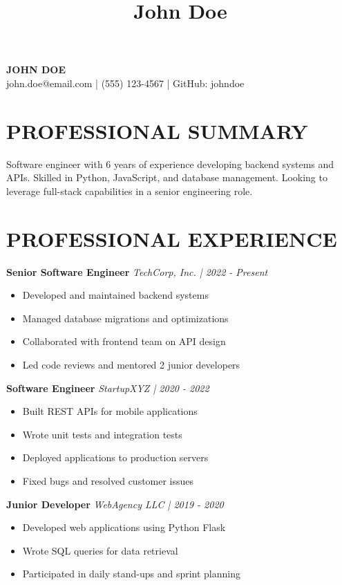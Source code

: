 \documentclass[11pt]{article}
\title{John Doe}
\author{}
\date{}
\begin{document}
\begin{center}
    {\Large \textbf{JOHN DOE}} \\
    john.doe@email.com | (555) 123-4567 | GitHub: johndoe
\end{center}

\section*{PROFESSIONAL SUMMARY}
Software engineer with 6 years of experience developing backend systems and APIs. Skilled in Python, JavaScript, and database management. Looking to leverage full-stack capabilities in a senior engineering role.

\section*{PROFESSIONAL EXPERIENCE}

\textbf{Senior Software Engineer} \hfill \textit{TechCorp, Inc. | 2022 - Present}
\begin{itemize}
    \item Developed and maintained backend systems
    \item Managed database migrations and optimizations
    \item Collaborated with frontend team on API design
    \item Led code reviews and mentored 2 junior developers
\end{itemize}

\textbf{Software Engineer} \hfill \textit{StartupXYZ | 2020 - 2022}
\begin{itemize}
    \item Built REST APIs for mobile applications
    \item Wrote unit tests and integration tests
    \item Deployed applications to production servers
    \item Fixed bugs and resolved customer issues
\end{itemize}

\textbf{Junior Developer} \hfill \textit{WebAgency LLC | 2019 - 2020}
\begin{itemize}
    \item Developed web applications using Python Flask
    \item Wrote SQL queries for data retrieval
    \item Participated in daily stand-ups and sprint planning
\end{itemize}
\end{document}
